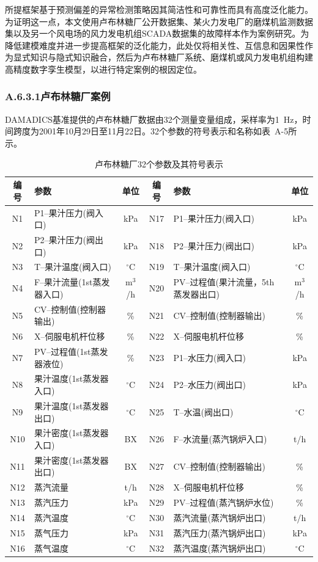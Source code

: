 所提框架基于预测偏差的异常检测策略因其简洁性和可靠性而具有高度泛化能力。为证明这一点，本文使用卢布林糖厂公开数据集、某火力发电厂的磨煤机监测数据集以及另一个风电场的风力发电机组SCADA数据集的故障样本作为案例研究。为降低建模难度并进一步提高框架的泛化能力，此处仅将相关性、互信息和因果性作为显式知识与隐式知识融合，然后为卢布林糖厂系统、磨煤机或风力发电机组构建高精度数字孪生模型，以进行特定案例的根因定位。

\subsubsection*{A.6.3.1\quad 卢布林糖厂案例}

DAMADICS基准提供的卢布林糖厂数据由32个测量变量组成，采样率为1~Hz，时间跨度为2001年10月29日至11月22日。32个参数的符号表示和名称如表~A-5所示。

\begin{table}[htbp]
\centering
\caption{卢布林糖厂32个参数及其符号表示}
\label{tab:appA-sugar}
\small
\begin{tabular}{clccl c}
\toprule
编号 & 参数 & 单位 & 编号 & 参数 & 单位 \\
\midrule
N1 & P1--果汁压力(阀入口) & kPa & N17 & P1--果汁压力(阀入口) & kPa \\
N2 & P2--果汁压力(阀出口) & kPa & N18 & P2--果汁压力(阀出口) & kPa \\
N3 & T--果汁温度(阀入口) & $^\circ$C & N19 & T--果汁温度(阀入口) & $^\circ$C \\
N4 & F--果汁流量(1st蒸发器入口) & m$^3$/h & N20 & PV--过程值(果汁流量，5th蒸发器出口) & m$^3$/h \\
N5 & CV--控制值(控制器输出) & \% & N21 & CV--控制值(控制器输出) & \% \\
N6 & X--伺服电机杆位移 & \% & N22 & X--伺服电机杆位移 & \% \\
N7 & PV--过程值(1st蒸发器液位) & \% & N23 & P1--水压力(阀入口) & kPa \\
N8 & 果汁温度(1st蒸发器入口) & $^\circ$C & N24 & P2--水压力(阀出口) & kPa \\
N9 & 果汁温度(1st蒸发器出口) & $^\circ$C & N25 & T--水温(阀出口) & $^\circ$C \\
N10 & 果汁密度(1st蒸发器入口) & BX & N26 & F--水流量(蒸汽锅炉入口) & t/h \\
N11 & 果汁密度(1st蒸发器出口) & BX & N27 & CV--控制值(控制器输出) & \% \\
N12 & 蒸汽流量 & t/h & N28 & X--伺服电机杆位移 & \% \\
N13 & 蒸汽压力 & kPa & N29 & PV--过程值(蒸汽锅炉水位) & \% \\
N14 & 蒸汽温度 & $^\circ$C & N30 & 蒸汽流量(蒸汽锅炉出口) & t/h \\
N15 & 蒸气压力 & kPa & N31 & 蒸汽压力(蒸汽锅炉出口) & kPa \\
N16 & 蒸气温度 & $^\circ$C & N32 & 蒸汽温度(蒸汽锅炉出口) & $^\circ$C \\
\bottomrule
\end{tabular}
\end{table}

